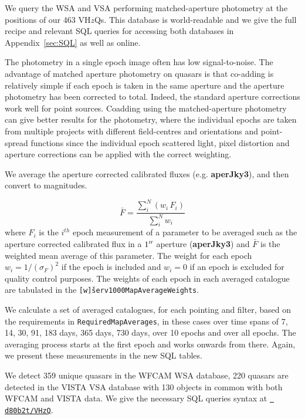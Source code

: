 \documentclass[usenatbib]{mnras}
\begin{document}
  We query the WSA and VSA performing matched-aperture photometry at
  the positions of our 463 VH$z$Qs. This database is world-readable and
  we give the full recipe and relevant SQL queries for accessing both
  databases in Appendix~\ref{sec:SQL} as well as online. 

  The photometry in a single epoch image often has low
  signal-to-noise.  The advantage of matched aperture photometry on
  quasars is that co-adding is relatively simple if each epoch is taken
  in the same aperture and the aperture photometry has been corrected to
  total. Indeed, the standard aperture corrections work well for point
  sources. Coadding using the matched-aperture photometry can give better results for the photometry, 
  where the individual epochs are taken from multiple projects with different field-centres and orientations and point-spread functions since the individual epoch scattered light, pixel distortion and aperture corrections can be applied with the correct weighting.

  We average the aperture corrected calibrated fluxes (e.g. {\bf
  aperJky3}), and then convert to magnitudes. 

  \begin{equation}
    \bar{F} = \frac{\sum_i^N (w_i\,F_i)}{\sum_i^N w_i}  
    \label{eq:avg}
  \end{equation}
  where $F_i$ is the $i^{th}$ epoch measurement of a parameter to be
  averaged such as the aperture corrected calibrated flux in a $1\hbox{$^{\prime\prime}$}$ aperture
  ({\bf aperJky3}) and $\bar{F}$ is the weighted mean average of this parameter.
  The weight for each epoch $w_i=1/(\sigma_{F})^2$ if the epoch is included and 
  $w_i=0$ if an epoch is excluded for quality control purposes. The weights of each epoch in each averaged catalogue are tabulated in the {\tt [w\v]serv1000MapAverageWeights}.

  We calculate a set of averaged catalogues, for each pointing and filter, based
  on the requirements in \verb+RequiredMapAverages+, in these cases over time
  spans of 7, 14, 30, 91, 183 days, 365 days, 730 days, over 10 epochs and
  over all epochs. The averaging process starts at the first epoch and works onwards 
  from there. Again, we present these measurements in the new SQL tables. 

  We detect 359 unique quasars in the WFCAM WSA database, 220 quasars
  are detected in the VISTA VSA database with 130 objects in common with
  both WFCAM and VISTA data.  We give the necessary SQL queries syntax
  at \href{https://github.com/d80b2t/VHzQ/blob/master/data/WSA_VSA/SAMPLE_SQL_QUERIES}{\tt
    d80b2t/VHzQ}.
\end{document}
